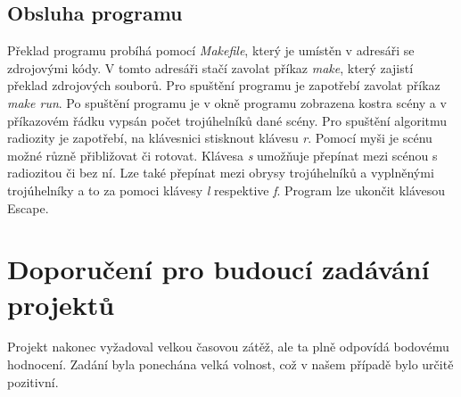 \documentclass[12pt,a4paper,titlepage,final]{report}
\begin{document}
\section{Obsluha programu}
Překlad programu probíhá pomocí \textit{Makefile}, který je umístěn v adresáři se zdrojovými kódy. V tomto adresáři stačí zavolat příkaz \textit{make}, který zajistí překlad zdrojových souborů. Pro spuštění programu je zapotřebí zavolat příkaz \textit{make run}. Po spuštění programu je v okně programu zobrazena kostra scény a v příkazovém řádku vypsán počet trojúhelníků dané scény. Pro spuštění algoritmu radiozity je zapotřebí, na klávesnici stisknout klávesu \textit{r}. Pomocí myši je scénu možné různě přibližovat či rotovat. Klávesa \textit{s} umožňuje přepínat mezi scénou s radiozitou či bez ní. Lze také přepínat mezi obrysy trojúhelníků a vyplněnými trojúhelníky a to za pomoci klávesy \textit{l} respektive \textit{f}. Program lze ukončit klávesou Escape.
\chapter{Doporučení pro budoucí zadávání projektů}
Projekt nakonec vyžadoval velkou časovou zátěž, ale ta plně odpovídá bodovému hodnocení. Zadání byla ponechána velká volnost, což v našem případě bylo určitě pozitivní. 






{\let\clearpage\relax}
\end{document}
